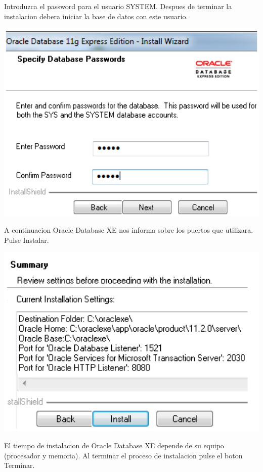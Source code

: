\documentclass[12pt,letterpaper]{article}
\begin{document}
Introduzca el password para el usuario SYSTEM. Despues de terminar la instalacion debera iniciar la base de datos con este usuario.

\begin{center}
\includegraphics[width=15cm]{./IMG/img27}
\end{center}
A continuacion Oracle Database XE nos informa sobre los puertos que utilizara. Pulse Instalar.
\begin{center}
\includegraphics[width=15cm]{./IMG/img28}
\end{center}
El tiempo de instalacion de Oracle Database XE depende de su equipo (procesador y memoria). Al terminar el proceso de instalacion pulse el boton Terminar.
\end{document}

